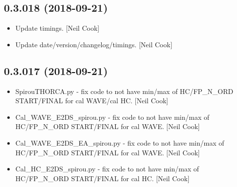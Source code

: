 \documentclass[a4paper,10pt,english]{report}
\begin{document}
\subsection{0.3.018 (2018-09-21)}
\label{\detokenize{misc/changelog:id312}}\begin{itemize}
\item {} 
Update timings. {[}Neil Cook{]}

\item {} 
Update date/version/changelog/timings. {[}Neil Cook{]}

\end{itemize}


\subsection{0.3.017 (2018-09-21)}
\label{\detokenize{misc/changelog:id313}}\begin{itemize}
\item {} 
SpirouTHORCA.py - fix code to not have min/max of HC/FP\_N\_ORD
START/FINAL for cal WAVE/cal HC. {[}Neil Cook{]}

\item {} 
Cal\_WAVE\_E2DS\_spirou.py - fix code to not have min/max of HC/FP\_N\_ORD
START/FINAL for cal WAVE. {[}Neil Cook{]}

\item {} 
Cal\_WAVE\_E2DS\_EA\_spirou.py - fix code to not have min/max of
HC/FP\_N\_ORD START/FINAL for cal WAVE. {[}Neil Cook{]}

\item {} 
Cal\_HC\_E2DS\_spirou.py - fix code to not have min/max of HC/FP\_N\_ORD
START/FINAL for cal HC. {[}Neil Cook{]}

\end{itemize}
\end{document}
